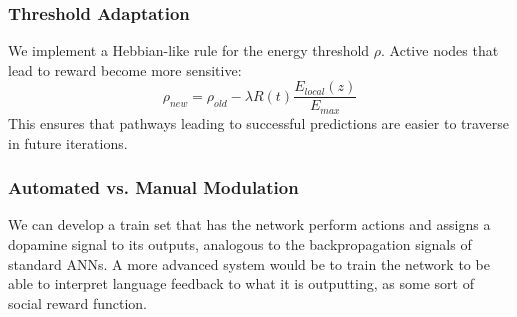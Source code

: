 \documentclass{article}
\begin{document}
\subsubsection{Threshold Adaptation}
We implement a Hebbian-like rule for the energy threshold $\rho$. Active nodes that lead to reward become more sensitive:
\begin{equation}
    \rho_{new} = \rho_{old} - \lambda R(t) \frac{E_{local}(z)}{E_{max}}
\end{equation}
This ensures that pathways leading to successful predictions are easier to traverse in future iterations.

\subsubsection{Automated vs. Manual Modulation}
We can develop a train set that has the network perform actions and assigns a dopamine signal to its outputs, analogous to the backpropagation signals of standard ANNs. A more advanced system would be to train the network to be able to interpret language feedback to what it is outputting, as some sort of social reward function.
\end{document}
